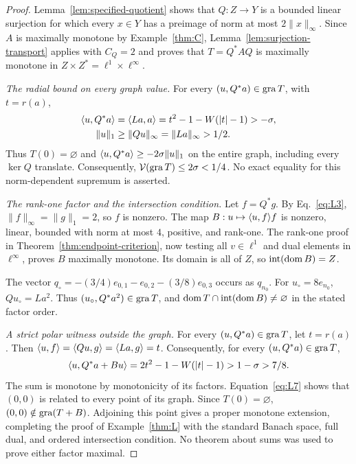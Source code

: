 \begin{proof}
Lemma~\ref{lem:specified-quotient} shows that $Q:Z\to Y$ is a bounded
linear surjection for which every $x\in Y$ has a preimage of norm at most
$2\|x\|_\infty$. Since $A$ is maximally monotone by Example~\ref{thm:C},
Lemma~\ref{lem:surjection-transport} applies with $C_Q=2$ and proves that
$T=Q^*AQ$ is maximally monotone in $Z\times Z^*=\ell^1\times\ell^\infty$.

\noindent\textit{The radial bound on every graph value.}
\label{sec:L3}
For every $(u,Q^*a)\in\operatorname{gra} T$, with $t=r(a)$,
\begin{equation}
\begin{aligned}
\langle u,Q^*a\rangle&=\langle La,a\rangle
 =t^2-1-W(|t|-1)>-\sigma,\\
\|u\|_1&\ge\|Qu\|_\infty=\|La\|_\infty>1/2.
\end{aligned}
\label{eq:L6}
\end{equation}
Thus $T(0)=\varnothing$ and $\langle u,Q^*a\rangle\ge-2\sigma\|u\|_1$ on
the entire graph, including every $\ker Q$ translate. Consequently,
$\mathcal V(\operatorname{gra} T)\le2\sigma<1/4$. No exact equality for this
norm-dependent supremum is asserted.

\noindent\textit{The rank-one factor and the intersection condition.}
\label{sec:L4}
Let $f=Q^*g$. By Eq.~\eqref{eq:L3}, $\|f\|_\infty=\|g\|_1=2$, so $f$
is nonzero. The map $B:u\mapsto\langle u,f\rangle f$ is nonzero, linear, bounded
with norm at most $4$, positive, and rank-one. The rank-one proof in
Theorem~\ref{thm:endpoint-criterion}, now testing all $v\in\ell^1$
and dual elements in $\ell^\infty$, proves $B$ maximally monotone.
Its domain is all of $Z$, so $\operatorname{int}(\operatorname{dom} B)=Z$.

The vector $q_\circ=-(3/4)e_{0,1}-e_{0,2}-(3/8)e_{0,3}$ occurs as
$q_{n_0}$. For $u_\circ=8e_{n_0}$, $Qu_\circ=La^2$.
Thus $(u_\circ,Q^*a^2)\in\operatorname{gra} T$, and
$\operatorname{dom} T\cap\operatorname{int}(\operatorname{dom} B)\ne\varnothing$ in the stated
factor order.

\noindent\textit{A strict polar witness outside the graph.}
\label{sec:L5}
For every $(u,Q^*a)\in\operatorname{gra} T$, let $t=r(a)$. Then
$\langle u,f\rangle=\langle Qu,g\rangle=\langle La,g\rangle=t$.
Consequently, for every $(u,Q^*a)\in\operatorname{gra} T$,
\begin{equation}
\langle u,Q^*a+Bu\rangle
 =2t^2-1-W(|t|-1)>1-\sigma>7/8.
\label{eq:L7}
\end{equation}
The sum is monotone by monotonicity of its factors.
Equation~\eqref{eq:L7} shows that $(0,0)$ is related to every point of its graph.
Since $T(0)=\varnothing$, $(0,0)\notin\operatorname{gra}(T+B)$. Adjoining this point
gives a proper monotone extension, completing the proof of
Example~\ref{thm:L} with the standard Banach space, full dual, and ordered
intersection condition. No theorem about sums was used to prove either
factor maximal.
\end{proof}

